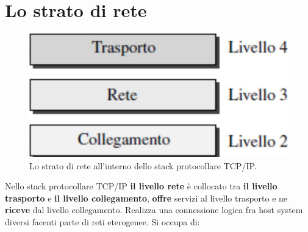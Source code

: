 \documentclass[11pt,a4paper,oneside]{book}
\theoremstyle{definition}
\begin{document}
\pagebreak

\section{Lo strato di rete}
\begin{figure}[!h]
	\includegraphics[scale=0.2]{Immagini/Ip.png}
	\centering
	\caption{Lo strato di rete all'interno dello stack protocollare TCP/IP.}
\end{figure}
Nello stack protocollare TCP/IP \textbf{il livello rete} è collocato tra \textbf{il livello trasporto} e \textbf{il livello collegamento}, \textbf{offre} servizi al livello trasporto e ne \textbf{riceve} dal livello collegamento. Realizza una connessione logica fra host system
diversi facenti parte di reti eterogenee. Si occupa di:
\end{document}
